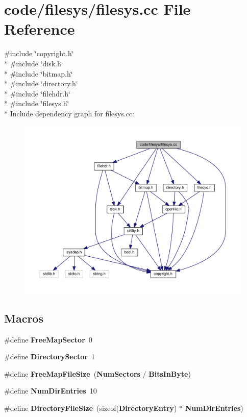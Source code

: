 \section{code/filesys/filesys.cc File Reference}
\label{filesys_8cc}
{\ttfamily \#include \char`\"{}copyright.\+h\char`\"{}}\\*
{\ttfamily \#include \char`\"{}disk.\+h\char`\"{}}\\*
{\ttfamily \#include \char`\"{}bitmap.\+h\char`\"{}}\\*
{\ttfamily \#include \char`\"{}directory.\+h\char`\"{}}\\*
{\ttfamily \#include \char`\"{}filehdr.\+h\char`\"{}}\\*
{\ttfamily \#include \char`\"{}filesys.\+h\char`\"{}}\\*
Include dependency graph for filesys.\+cc\+:
\nopagebreak
\begin{figure}[H]
\begin{center}
\leavevmode
\includegraphics[width=350pt]{filesys_8cc__incl}
\end{center}
\end{figure}
\subsection*{Macros}
\begin{DoxyCompactItemize}
\item 
\#define {\bf Free\+Map\+Sector}~0
\item 
\#define {\bf Directory\+Sector}~1
\item 
\#define {\bf Free\+Map\+File\+Size}~({\bf Num\+Sectors} / {\bf Bits\+In\+Byte})
\item 
\#define {\bf Num\+Dir\+Entries}~10
\item 
\#define {\bf Directory\+File\+Size}~(sizeof({\bf Directory\+Entry}) $\ast$ {\bf Num\+Dir\+Entries})
\end{DoxyCompactItemize}


